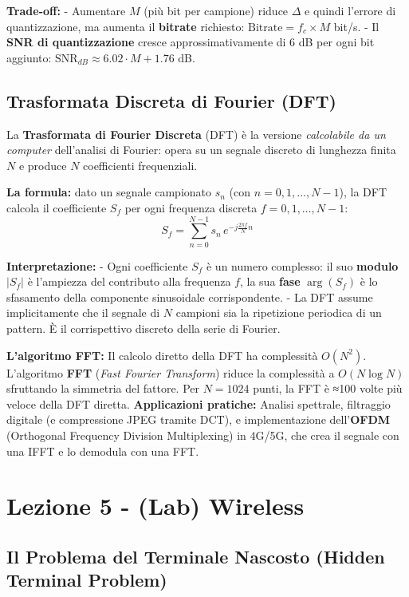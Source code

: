 \documentclass[
  italian,
  openany]{book}
\begin{document}
\textbf{Trade-off:} - Aumentare \(M\) (più bit per campione) riduce
\(\Delta\) e quindi l'errore di quantizzazione, ma aumenta il
\textbf{bitrate} richiesto: \(\text{Bitrate} = f_c \times M\) bit/s. -
Il \textbf{SNR di quantizzazione} cresce approssimativamente di 6 dB per
ogni bit aggiunto: \(\text{SNR}_{dB} \approx 6.02 \cdot M + 1.76\) dB.

\section{Trasformata Discreta di Fourier
(DFT)}\label{trasformata-discreta-di-fourier-dft}

La \textbf{Trasformata di Fourier Discreta} (DFT) è la versione
\emph{calcolabile da un computer} dell'analisi di Fourier: opera su un
segnale discreto di lunghezza finita \(N\) e produce \(N\) coefficienti
frequenziali.

\textbf{La formula:} dato un segnale campionato \(s_n\) (con
\(n = 0, 1, \ldots, N-1\)), la DFT calcola il coefficiente \(S_f\) per
ogni frequenza discreta \(f = 0, 1, \ldots, N-1\):
\[S_f = \sum_{n=0}^{N-1} s_n \, e^{-j\frac{2\pi f}{N}n}\]

\textbf{Interpretazione:} - Ogni coefficiente \(S_f\) è un numero
complesso: il suo \textbf{modulo} \(|S_f|\) è l'ampiezza del contributo
alla frequenza \(f\), la sua \textbf{fase} \(\arg(S_f)\) è lo sfasamento
della componente sinusoidale corrispondente. - La DFT assume
implicitamente che il segnale di \(N\) campioni sia la ripetizione
periodica di un pattern. È il corrispettivo discreto della serie di
Fourier.

\textbf{L'algoritmo FFT:} Il calcolo diretto della DFT ha complessità
\(O(N^2)\). L'algoritmo \textbf{FFT} (\emph{Fast Fourier Transform})
riduce la complessità a \(O(N \log N)\) sfruttando la simmetria del
fattore. Per \(N = 1024\) punti, la FFT è ≈100 volte più veloce della
DFT diretta. \textbf{Applicazioni pratiche:} Analisi spettrale,
filtraggio digitale (e compressione JPEG tramite DCT), e implementazione
dell'\textbf{OFDM} (Orthogonal Frequency Division Multiplexing) in
4G/5G, che crea il segnale con una IFFT e lo demodula con una FFT.

\newpage

\chapter{Lezione 5 - (Lab) Wireless}\label{lezione-5---lab-wireless}

\section{Il Problema del Terminale Nascosto (Hidden Terminal
Problem)}\label{il-problema-del-terminale-nascosto-hidden-terminal-problem}
\end{document}
